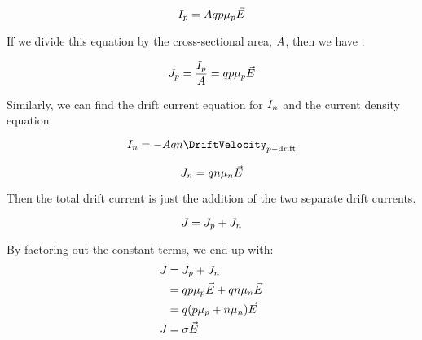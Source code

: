 \begin{equation*}
  I_{p} = A q p \mu_{p} \vec{E}
\end{equation*}

If we divide this equation by the cross-sectional area, $A$, then we have .

\begin{equation}\label{eq:Drift_Current_Density-Hole}
  J_{p} = \frac{I_{p}}{A} = q p \mu_{p} \vec{E}
\end{equation}

Similarly, we can find the drift current equation for $I_{n}$ and the current density equation.

\begin{equation}\label{eq:Drift_Current-Electron}
  \DCCurrent{\ElectronConcentration} = - \Area \eCharge \ElectronConcentration \DriftVelocity_{\HoleConcentration-\text{drift}}
\end{equation}

\begin{equation}\label{eq:Drift_Current_Density-Electron}
  J_{n} = q n \mu_{n} \vec{E}
\end{equation}

Then the total drift current is just the addition of the two separate drift currents.

\begin{equation}\label{eq:Total_Drift_Current_Density}
  J_{} = J_{p} + J_{n}
\end{equation}

By factoring out the constant terms, we end up with:
\begin{align*}
  J_{} &= J_{p} + J_{n} \\
                    &= q p \mu_{p} \vec{E} + q n \mu_{n} \vec{E} \\
                    &= q (p \mu_{p} + n \mu_{n}) \vec{E} \\
  J_{} &= \sigma \vec{E}
\end{align*}

